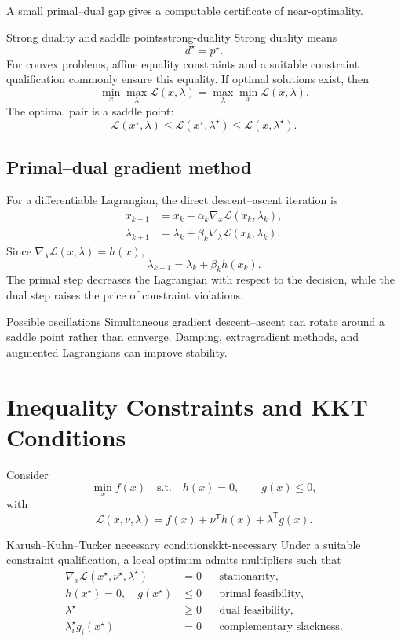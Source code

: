 \documentclass[11pt]{article}
\newcommand{\trans}{^{\mathsf T}}
\newcommand{\grad}{\nabla}
\theoremstyle{definition}
\theoremstyle{remark}
\begin{document}
A small primal--dual gap gives a computable certificate of near-optimality.

\begin{keyproposition}{Strong duality and saddle points}{strong-duality}
Strong duality means
\[
  \boxed{d^\star=p^\star.}
\]
For convex problems, affine equality constraints and a suitable constraint
qualification commonly ensure this equality. If optimal solutions exist, then
\[
  \boxed{
  \min_x\max_\lambda\mathcal L(x,\lambda)
  =\max_\lambda\min_x\mathcal L(x,\lambda).}
\]
The optimal pair is a saddle point:
\[
  \mathcal L(x^\star,\lambda)
  \leq\mathcal L(x^\star,\lambda^\star)
  \leq\mathcal L(x,\lambda^\star).
\]
\end{keyproposition}

\subsection{Primal--dual gradient method}

For a differentiable Lagrangian, the direct descent--ascent iteration is
\[
  \boxed{
  \begin{aligned}
  x_{k+1}&=x_k-\alpha_k\grad_x\mathcal L(x_k,\lambda_k),\\
  \lambda_{k+1}&=\lambda_k+\beta_k\grad_\lambda
  \mathcal L(x_k,\lambda_k).
  \end{aligned}}
\]
Since $\grad_\lambda\mathcal L(x,\lambda)=h(x)$,
\[
  \lambda_{k+1}=\lambda_k+\beta_k h(x_k).
\]
The primal step decreases the Lagrangian with respect to the decision, while
the dual step raises the price of constraint violations.

\begin{warningbox}{Possible oscillations}
Simultaneous gradient descent--ascent can rotate around a saddle point rather
than converge. Damping, extragradient methods, and augmented Lagrangians can
improve stability.
\end{warningbox}

\section{Inequality Constraints and KKT Conditions}

Consider
\[
  \min_x f(x)
  \quad\text{s.t.}\quad h(x)=0,\qquad g(x)\leq0,
\]
with
\[
  \mathcal L(x,\nu,\lambda)
  =f(x)+\nu\trans h(x)+\lambda\trans g(x).
\]

\begin{keyproposition}{Karush--Kuhn--Tucker necessary conditions}{kkt-necessary}
Under a suitable constraint qualification, a local optimum admits multipliers
such that
\[
  \boxed{
  \begin{aligned}
  \grad_x\mathcal L(x^\star,\nu^\star,\lambda^\star)&=0
    &&\text{stationarity},\\
  h(x^\star)=0,\quad g(x^\star)&\leq0
    &&\text{primal feasibility},\\
  \lambda^\star&\geq0
    &&\text{dual feasibility},\\
  \lambda_i^\star g_i(x^\star)&=0
    &&\text{complementary slackness}.
  \end{aligned}}
\]
\end{keyproposition}
\end{document}
